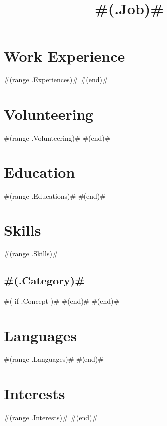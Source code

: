 \documentclass[10pt,a4paper]{moderncv}
\title{{\Huge #(.Job)#}}
\begin{document}
\maketitle
\vspace{-15pt}
\begin{center}
\hfill\begin{minipage}{\dimexpr\textwidth-2cm}
\end{minipage}
\end{center}

\vspace{+10pt}

\section{Work Experience}
#(range .Experiences)#
#(end)#

\section{Volunteering}
#(range .Volunteering)#
#(end)#

\section{Education}
#(range .Educations)#
#(end)#

\section{Skills}
\vspace{-20pt}

\begin{multicols}{2}[]
#(range .Skills)#
\hspace*{-1,5cm}\subsection{#(.Category)#}
#( if .Concept )#
#(end)#
#(end)#
\end{multicols}

\section{Languages}
#(range .Languages)#
#(end)#

\section{Interests}
#(range .Interests)#
#(end)#
\end{document}
